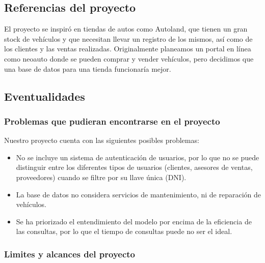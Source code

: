 \documentclass[12pt]{article}
\begin{document}
\subsection{Referencias del proyecto}

El proyecto se inspiró en tiendas de autos como Autoland, que tienen un gran stock de vehículos y que necesitan llevar un registro de los mismos, así como de los clientes y las ventas realizadas. Originalmente planeamos un portal en línea como neoauto donde se pueden comprar y vender vehículos, pero decidimos que una base de datos para una tienda funcionaría mejor.

\subsection{Eventualidades}

\subsubsection{Problemas que pudieran encontrarse en el proyecto}

Nuestro proyecto cuenta con las siguientes posibles problemas:

\begin{itemize}

\item No se incluye un sistema de autenticación de usuarios, por lo que no se puede distinguir entre los diferentes tipos de usuarios (clientes, asesores de ventas, proveedores) cuando se filtre por su llave única (DNI).

\item La base de datos no considera servicios de mantenimiento, ni de reparación de vehículos.

\item Se ha priorizado el entendimiento del modelo por encima de la eficiencia de las consultas, por lo que el tiempo de consultas puede no ser el ideal.



\end{itemize}


\subsubsection{Limites y alcances del proyecto}
\end{document}
